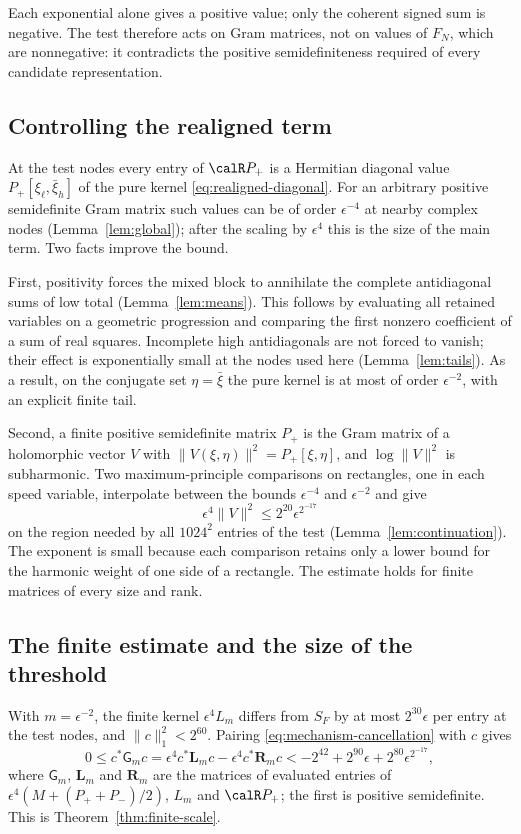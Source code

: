 Each exponential alone gives a positive value; only the coherent signed
sum is negative. The test therefore acts on Gram matrices, not on values
of $F_N$, which are nonnegative: it contradicts the positive
semidefiniteness required of every candidate representation.

\subsection{Controlling the realigned term}\label{sec:mech-continuation}
At the test nodes every entry of $\calR P_+$ is a Hermitian diagonal value
$P_+[\xi_\ell,\bar\xi_h]$ of the pure kernel \eqref{eq:realigned-diagonal}. For an
arbitrary positive semidefinite Gram matrix such values can be of order
$\epsilon^{-4}$ at nearby complex nodes (Lemma~\ref{lem:global}); after
the scaling by $\epsilon^4$ this is the size of the main term. Two facts
improve the bound.

First, positivity forces the mixed block to annihilate the complete
antidiagonal sums of low total (Lemma~\ref{lem:means}). This follows by
evaluating all retained variables on a geometric progression and
comparing the first nonzero coefficient of a sum of real squares.
Incomplete high antidiagonals are not forced to vanish; their effect is
exponentially small at the nodes used here (Lemma~\ref{lem:tails}). As
a result, on the conjugate set $\eta=\bar\xi$ the pure kernel is at most
of order $\epsilon^{-2}$, with an explicit finite tail.

Second, a finite positive semidefinite matrix $P_+$ is the Gram matrix of
a holomorphic vector $V$ with $\|V(\xi,\eta)\|^2=P_+[\xi,\eta]$, and
$\log\|V\|^2$ is subharmonic. Two maximum-principle comparisons on
rectangles, one in each speed variable, interpolate between the bounds
$\epsilon^{-4}$ and $\epsilon^{-2}$ and give
\[
 \epsilon^4\|V\|^2\le2^{20}\epsilon^{2^{-17}}
\]
on the region needed by all $1024^2$ entries of the test
(Lemma~\ref{lem:continuation}). The exponent is small because each
comparison retains only a lower bound for the harmonic weight of one
side of a rectangle. The estimate holds for finite matrices of every
size and rank.

\subsection{The finite estimate and the size of the threshold}\label{sec:mech-estimate}
With $m=\epsilon^{-2}$, the finite kernel $\epsilon^4L_m$ differs from
$S_F$ by at most $2^{30}\epsilon$ per entry at the test nodes, and
$\|c\|_1^2<2^{60}$. Pairing \eqref{eq:mechanism-cancellation} with $c$
gives
\[
 0\le c^*\mathsf G_mc
 =\epsilon^4c^*\mathbf L_mc-\epsilon^4c^*\mathbf R_mc
 <-2^{42}+2^{90}\epsilon+2^{80}\epsilon^{2^{-17}},
\]
where $\mathsf G_m$, $\mathbf L_m$ and $\mathbf R_m$ are the matrices of
evaluated entries of $\epsilon^4(M+(P_++P_-)/2)$, $L_m$ and $\calR P_+$;
the first is positive semidefinite. This is Theorem~\ref{thm:finite-scale}.

